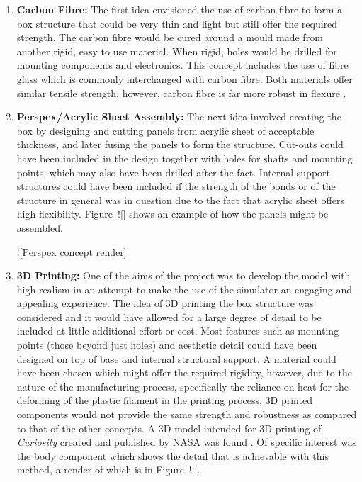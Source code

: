       \begin{enumerate}
        \item \textbf{Carbon Fibre:} The first idea envisioned the use of carbon fibre to form a box structure that could be very thin and light but still offer the required strength. The carbon fibre would be cured around a mould made from another rigid, easy to use material. When rigid, holes would be drilled for mounting components and electronics. This concept includes the use of fibre glass which is commonly interchanged with carbon fibre. Both materials offer similar tensile strength, however, carbon fibre is far more robust in flexure \cite{fibreGlast_2016}.
        
        \item \textbf{Perspex/Acrylic Sheet Assembly:} The next idea involved creating the box by designing and cutting panels from acrylic sheet of acceptable thickness, and later fusing the panels to form the structure. Cut-outs could have been included in the design together with holes for shafts and mounting points, which may also have been drilled after the fact. Internal support structures could have been included if the strength of the bonds or of the structure in general was in question due to the fact that acrylic sheet offers high flexibility. Figure~![] shows an example of how the panels might be assembled.
        
        ![Perspex concept render]
        \item \textbf{3D Printing:} One of the aims of the project was to develop the model with high realism in an attempt to make the use of the simulator an engaging and appealing experience. The idea of 3D printing the box structure was considered and it would have allowed for a large degree of detail to be included at little additional effort or cost. Most features such as mounting points (those beyond just holes) and aesthetic detail could have been designed on top of base and internal structural support. A material could have been chosen which might offer the required rigidity, however, due to the nature of the manufacturing process, specifically the reliance on heat for the deforming of the plastic filament in the printing process, 3D printed components would not provide the same strength and robustness as compared to that of the other concepts. A 3D model intended for 3D printing of \textit{Curiosity} created and published by NASA was found \cite{nasa3Dprint}. Of specific interest was the body component which shows the detail that is achievable with this method, a render of which is in Figure~![].
        

\end{enumerate}
